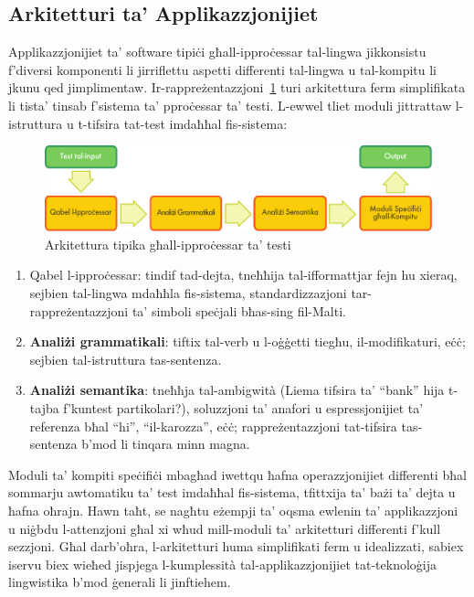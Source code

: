 \documentclass[]{../../metanetpaper}
\begin{document}
\begin{multicols}{2}
\subsection{Arkitetturi ta’ Applikazzjonijiet}

Applikazzjonijiet ta’ software tipiċi għall-ipproċessar tal-lingwa jikkonsistu f'diversi komponenti li jirriflettu aspetti differenti tal-lingwa u tal-kompitu li jkunu qed jimplimentaw. Ir-rappreżentazzjoni~\ref{fig:textprocessingarch_mt}  turi arkitettura ferm simplifikata li tista’ tinsab f’sistema ta’ pproċessar ta’ testi. L-ewwel tliet moduli jittrattaw l-istruttura u t-tifsira tat-test imdaħħal fis-sistema: 

\begin{figure}[htb]
  \center
  \includegraphics[width=\textwidth]{../_media/maltese/text_processing_app_architecture}
  \caption{Arkitettura tipika għall-ipproċessar ta' testi}
  \label{fig:textprocessingarch_mt}
\end{figure}

\begin{enumerate}
\item Qabel l-ipproċessar: tindif tad-dejta, tneħħija tal-ifformattjar fejn hu xieraq, sejbien tal-lingwa mdaħħla fis-sistema, standardizzazjoni tar-rappreżentazzjoni ta’ simboli speċjali bħas-sing fil-Malti.
\item \textbf{Analiżi grammatikali}:  tiftix tal-verb u l-oġġetti tiegħu, il-modifikaturi, eċċ;  sejbien tal-istruttura tas-sentenza.
\item \textbf{Analiżi semantika}: tneħħja tal-ambigwità (Liema tifsira ta’ “bank” hija t-tajba f’kuntest partikolari?), soluzzjoni ta’ anafori u espressjonijiet ta' referenza bħal “hi”, “il-karozza”, eċċ; rappreżentazzjoni tat-tifsira tas-sentenza b’mod li tinqara minn magna.
\end{enumerate}

Moduli ta’ kompiti speċifiċi mbagħad iwettqu ħafna operazzjonijiet differenti bħal sommarju awtomatiku ta’ test imdaħħal fis-sistema, tfittxija ta’ bażi ta' dejta u ħafna oħrajn. Hawn taħt, se nagħtu eżempji ta’ oqsma ewlenin ta’ applikazzjoni u niġbdu l-attenzjoni għal xi wħud mill-moduli ta’ arkitetturi differenti f'kull sezzjoni. Għal darb’oħra, l-arkitetturi huma simplifikati ferm u idealizzati, sabiex iservu biex wieħed jispjega l-kumplessità tal-applikazzjonijiet tat-teknoloġija lingwistika b'mod ġenerali li jinftiehem.


\end{multicols}
\end{document}
